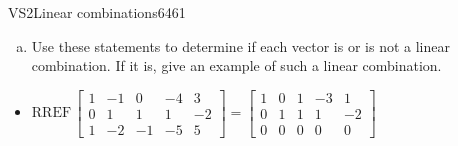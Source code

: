 \begin{exercise}{VS2}{Linear combinations}{6461}
\begin{exerciseStatement}
\begin{enumerate}[(a)]
\begin{itemize}
 \(\left[\begin{array}{c}
2 \\
-3 \\
4
\end{array}\right]\)is a linear combination of the vectors \(\left[\begin{array}{c}
1 \\
0 \\
1
\end{array}\right] , \left[\begin{array}{c}
-1 \\
1 \\
-2
\end{array}\right] , \left[\begin{array}{c}
0 \\
1 \\
-1
\end{array}\right] , \text{ and } \left[\begin{array}{c}
-4 \\
1 \\
-5
\end{array}\right]\). 

 
\end{itemize}

     
\item  

 Use these statements to determine if each vector is or is not a linear combination. If it is, give an example of such a linear combination. 

 
\end{enumerate}

     \end{exerciseStatement}
 \begin{exerciseAnswer} 

\begin{itemize}
\item  

 \(
\mathrm{RREF}\, \left[\begin{array}{cccc|c}
1 & -1 & 0 & -4 & 3 \\
0 & 1 & 1 & 1 & -2 \\
1 & -2 & -1 & -5 & 5
\end{array}\right] = \left[\begin{array}{cccc|c}
1 & 0 & 1 & -3 & 1 \\
0 & 1 & 1 & 1 & -2 \\
0 & 0 & 0 & 0 & 0
\end{array}\right]
                        \) 


\end{itemize}
\end{exerciseAnswer}
\end{exercise}

